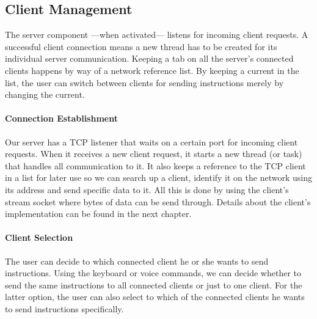 \newpage
\subsection{Client Management}
The server component ---when activated--- listens for incoming client requests. A successful client connection means a new thread has to be created for its individual server communication. Keeping a tab on all the server's connected clients happens by way of a network reference list. By keeping a current in the list, the user can switch between clients for sending instructions merely by changing the current.

\paragraph{Connection Establishment}
Our server has a TCP listener that waits on a certain port for incoming client requests. When it receives a new client request, it starts a new thread (or task) that handles all communication to it. It also keeps a reference  to the TCP client in a list for later use so we can search up a client, identify it on the network using its address and send specific data to it. All this is done by using the client's stream socket where bytes of data can be send through. Details about the client's implementation can be found in the next chapter.

\paragraph{Client Selection}
The user can decide to which connected client he or she wants to send instructions. Using the keyboard or voice commands, we can decide whether to send the same instructions to all connected clients or just to one client. For the latter option, the user can also select to which of the connected clients he wants to send instructions specifically.





